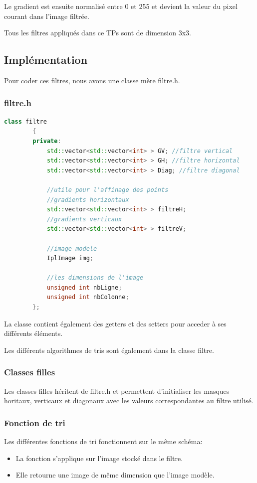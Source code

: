 \documentclass[11pt]{article}
\begin{document}
	Le gradient est ensuite normalisé entre 0 et 255 et devient la valeur du pixel courant dans l'image filtrée.

	Tous les filtres appliqués dans ce TPs sont de dimension 3x3.

	\subsection{Implémentation}

		Pour coder ces filtres, nous avons une classe mère filtre.h. 
		\subsubsection{filtre.h}

		\begin{lstlisting}[caption={Classe filtre},language=C++,label=filtre]
		class filtre
		{
		private:
			std::vector<std::vector<int> > GV; //filtre vertical
			std::vector<std::vector<int> > GH; //filtre horizontal
			std::vector<std::vector<int> > Diag; //filtre diagonal

			//utile pour l'affinage des points
			//gradients horizontaux
			std::vector<std::vector<int> > filtreH; 
			//gradients verticaux
			std::vector<std::vector<int> > filtreV; 

			//image modele
			IplImage img;

			//les dimensions de l'image
			unsigned int nbLigne;
			unsigned int nbColonne;
		};
		\end{lstlisting}

		La classe contient également des getters et des setters pour acceder à ses différents éléments.

		Les différents algorithmes de tris sont également dans la classe filtre.

		\subsubsection{Classes filles}

			Les classes filles héritent de filtre.h et permettent d'initialiser les masques horitaux, verticaux et diagonaux avec les valeurs correspondantes au filtre utilisé.

		\subsubsection{Fonction de tri}

			Les différentes fonctions de tri fonctionnent sur le même schéma: 
			\begin{itemize}
			\item La fonction s'applique sur l'image stocké dans le filtre.
			\item Elle retourne une image de même dimension que l'image modèle.
			\end{itemize}
\end{document}
